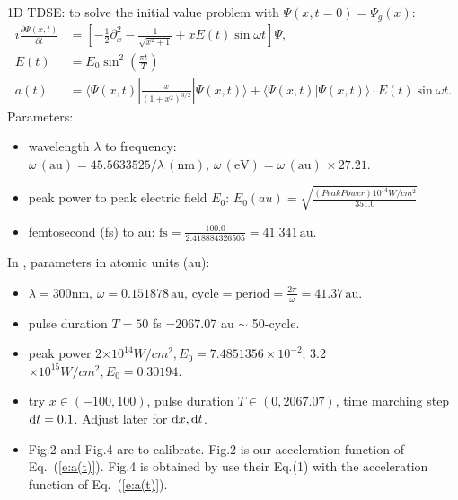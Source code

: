 \documentclass{isildur}
\begin{document}
1D TDSE: to solve the initial value problem with $\Psi(x,t=0)=\Psi_g(x)$:
%
\begin{align}
  i\frac{\partial \Psi(x,t)}{\partial t} &=
    \left[
      -\frac{1}{2}\partial^2_{x} - \frac{1}{\sqrt{x^2+1}} + xE(t)\sin\omega t
    \right]\Psi, \\
  E(t) &= E_{0}\sin^2(\frac{\pi t}{T}) \\
  a(t) &= \langle \Psi(x,t)|\frac{x}{(1+x^2)^{3/2}}|\Psi(x,t) \rangle
        + \langle \Psi(x,t)|\Psi(x,t) \rangle \cdot E(t)\sin\omega t.
    \label{e:a(t)}
\end{align}
%
Parameters:
%
\begin{itemize}

  \item wavelength $\lambda$ to frequency:
  $\omega \,\mathrm{(au)} = 45.5633525 / \lambda \,\mathrm{(nm)}, \,
  \omega \,\mathrm{(eV)} = \omega \,\mathrm{(au)}\, \times 27.21$.

  \item peak power to peak electric field $E_0$:
  $E_0(au)=\sqrt{\frac{(PeakPower) 10^{14}{W/cm^2}}{351.0}}$

  \item femtosecond (fs) to au: $\mathrm{fs} = \frac{100.0}{2.418884326505} =
  41.341 \,\mathrm{au}$.

\end{itemize}
%
In \cite{burnett_calculation_1992}, parameters in atomic units (au):
%
\begin{itemize}

  \item $\lambda=300\mathrm{nm}, \,\omega=0.151878 \,\mathrm{au}$,
  $\mathrm{cycle} = \mathrm{period} = \frac{2\pi}{\omega} = 41.37
  \,\mathrm{au}$.

  \item pulse duration $T=50$ fs =2067.07 au $\sim$ 50-cycle.

  \item peak power 2$\times 10^{14}W/cm^2, E_0=7.4851356\times 10^{-2}$;
  3.2$\times 10^{15}W/cm^2, E_0=0.30194$.

  \item try $x\in (-100,100)$, pulse duration  $T \in (0,2067.07)$, time
  marching step $\mathop{}\!\mathrm{d} t=0.1$.  Adjust later for $\mathop{}\!\mathrm{d} x, \mathop{}\!\mathrm{d} t$.

  \item Fig.2 and Fig.4 are to calibrate.  Fig.2 is our acceleration function
  of Eq.~(\ref{e:a(t)}).  Fig.4 is obtained by use their Eq.(1) with the
  acceleration function of Eq.~(\ref{e:a(t)}).

\end{itemize}

\clearpage
{}


\end{document}
